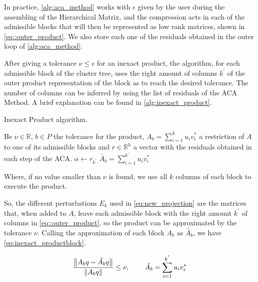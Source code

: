 

In practice, \ref{alg:aca_method} works with $\epsilon$ given by the user during the assembling of the Hierarchical Matrix, and the compression acts in each of the admissible blocks that will then be represented as low rank matrices, shown in \ref{eq::outer_product}. We also store each one of the residuals obtained in the outer loop of \ref{alg:aca_method}.

After giving a tolerance $\nu  \leq \epsilon$ for an inexact product, the algorithm, for each admissible block of the cluster tree, uses the right amount of columns $k^{'}$ of the outer product representation of the block as to reach the desired tolerance. The number of columns can be inferred by using the list of residuals of the ACA Method. A brief explanation can be found in \ref{alg:inexact_product}.

\begin{algorithm}
    \caption{Inexact Product algorithm.}\label{alg:inexact_product}
    \begin{algorithmic}[1]
        \State Be $\nu \in \mathbb{R}$, $b \in P$ the tolerance for the product,  $A_{b}= \sum_{i=1}^{k}u_{i}v_{i}^{*}$ a restriction of $A$ to one of its admissible blocks and $r \in \mathbb{R^{k}}$ a vector with the residuals obtained in each step of the ACA.
        \State $\alpha \leftarrow r_{k^{'}}$
        \If{$\alpha \leq \nu$}
        \State $\tilde{A_{b}}=\sum_{i=1}^{k^{'}}u_{i}v_{i}^{*}$
        \EndIf
        \EndFor

    \end{algorithmic}
\end{algorithm}

Where, if no value smaller than $\nu$ is found, we use all $k$ columns of each block to execute the product.

So, the different perturbations $E_{k}$ used in \ref{eq:new_projection} are the matrices that, when added to $A$, leave each admissible block with the right amount $k^{'}$ of columns in \ref{eq::outer_product}, so the product can be approximated by the tolerance $\nu$. Calling the approximation of each block $A_{b}$ as $\tilde{A_{b}}$, we have \ref{eq:inexact_productblock}.

\begin{equation}\label{eq:inexact_productblock}
    \frac{\left\lVert A_{b}q - \tilde{A_{b}}q \right\rVert}{\left\lVert A_{b}q\right\rVert} \leq \nu, \hspace{0.3in} \tilde{A_{b}} = \sum_{i=1} ^{k^{'}} u_{i} v_{i} ^{*}
\end{equation}


